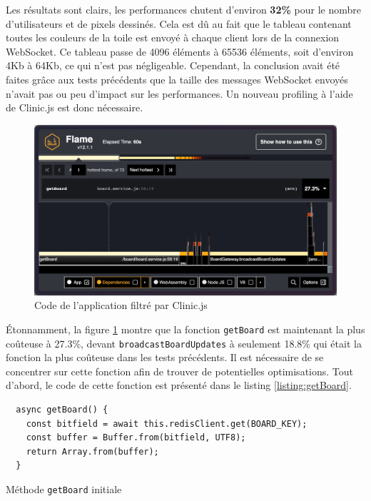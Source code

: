 Les résultats sont clairs, les performances chutent d'environ \textbf{32\%} pour le nombre d'utilisateurs et de pixels dessinés. Cela est dû au fait que le tableau contenant toutes les couleurs de la toile est envoyé à chaque client lors de la connexion WebSocket. Ce tableau passe de 4096 éléments à 65536 éléments, soit d'environ 4Kb à 64Kb, ce qui n'est pas négligeable. Cependant, la conclusion avait été faites grâce aux tests précédents que la taille des messages WebSocket envoyés n'avait pas ou peu d'impact sur les performances. Un nouveau profiling à l'aide de Clinic.js est donc nécessaire.


\begin{figure}[H]
  \centering
  \includegraphics[width=1\textwidth]{./assets/figures/flame/flame3-filtered.png}
  \caption{Code de l'application filtré par Clinic.js}
  \label{fig:flame3-filtered}
\end{figure}

Étonnamment, la figure \ref{fig:flame3-filtered} montre que la fonction \texttt{getBoard} est maintenant la plus coûteuse à 27.3\%, devant \texttt{broadcastBoardUpdates} à seulement 18.8\%  qui était la fonction la plus coûteuse dans les tests précédents. Il est nécessaire de se concentrer sur cette fonction afin de trouver de potentielles optimisations. Tout d'abord, le code de cette fonction est présenté dans le listing \ref{listing:getBoard}.

\begin{listing}[H]
  \begin{verbatim}
  async getBoard() {
    const bitfield = await this.redisClient.get(BOARD_KEY);
    const buffer = Buffer.from(bitfield, UTF8);
    return Array.from(buffer);
  }
\end{verbatim}
  \caption{Méthode \texttt{getBoard} initiale}
  \label{listing:getBoard}
\end{listing}


